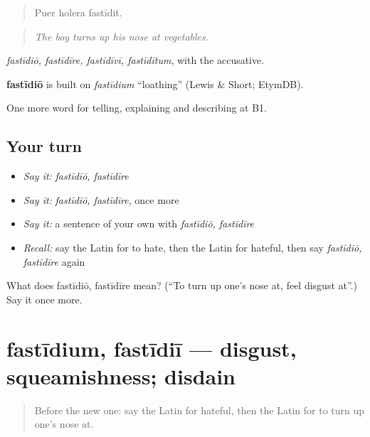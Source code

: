 \begin{quote}
Puer holera fastīdit.
\end{quote}

\begin{quote}
\emph{The boy turns up his nose at vegetables.}
\end{quote}

\emph{fastīdiō, fastīdīre, fastīdīvī, fastīdītum}, with the accusative.

\begin{cousinweb}
\textbf{fastīdiō} is built on \emph{fastīdium} \textquotedblleft{}loathing\textquotedblright{} (Lewis \& Short; EtymDB).
\end{cousinweb}

\begin{grammarlens}[title={What you've built}]
One more word for telling, explaining and describing at B1.
\end{grammarlens}

\subsection*{Your turn}
\begin{itemize}
\raggedright
  \item \emph{Say it:} \emph{fastīdiō, fastīdīre}
  \item \emph{Say it:} \emph{fastīdiō, fastīdīre}, once more
  \item \emph{Say it:} a sentence of your own with \emph{fastīdiō, fastīdīre}
  \item \emph{Recall:} say the Latin for to hate, then the Latin for hateful, then say \emph{fastīdiō, fastīdīre} again
\end{itemize}

\begin{tcolorbox}[breakable,colback=teal!4,colframe=teal!35!black,title={Before you move on}]
What does fastīdiō, fastīdīre mean? (\textquotedblleft{}To turn up one's nose at, feel disgust at\textquotedblright{}.) Say it once more.
\end{tcolorbox}
\section[fastīdium, fastīdiī]{fastīdium, fastīdiī — disgust, squeamishness; disdain}

\label{lesson:LA-C494-fastidium}



\begin{quote}
Before the new one: say the Latin for hateful, then the Latin for to turn up one's nose at.
\end{quote}

